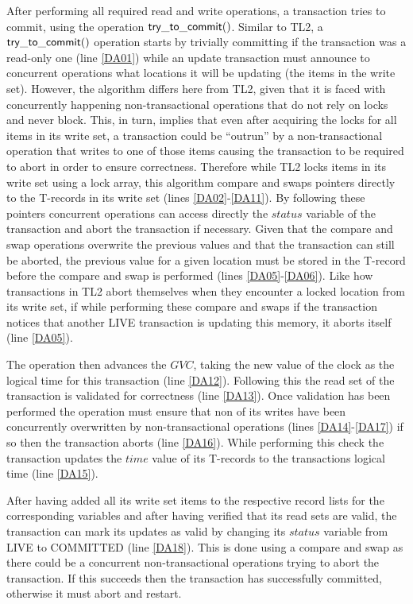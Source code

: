 \documentclass[11pt,letterpaper]{article}
\begin{document}
After  performing all  required read  and write  operations,  a transaction
tries to commit, using the operation  ${\sf try\_to\_commit()}$.
Similar to TL2, a ${\sf try\_to\_commit()}$ operation 
starts by trivially committing if the transaction was a read-only one 
(line \ref{DA01}) while
an update transaction must announce to concurrent operations what locations it will be updating
(the items in the write set).
However, the algorithm  differs 
here from TL2, given that 
it is faced with concurrently happening non-transactional operations
that do not rely on locks and never block. 
This, in turn, implies 
that even after acquiring the locks for all items in its write set, 
a transaction could be {}``outrun'' by 
a non-transactional operation that writes to one of those items
causing the transaction to be required to abort in order to ensure correctness. 
Therefore while TL2 locks items in its write set using a
lock array, this algorithm compare and swaps pointers directly to the T-records
in its write set (lines \ref{DA02}-\ref{DA11}).
By following these pointers concurrent operations can access directly the
$\mathit{status}$ variable of the transaction and abort the transaction
if necessary.
Given that the compare and swap operations overwrite the previous values
and that the transaction can still be aborted,
the previous value for a given location must be stored in the T-record
before the compare and swap is performed (lines \ref{DA05}-\ref{DA06}).
Like how transactions in TL2 abort themselves when they encounter a locked
location from its write set,
if while performing these compare and swaps if the transaction notices
that another LIVE transaction is updating this memory, it aborts itself
(line \ref{DA05}).

The operation then advances the $\mathit{GVC}$, taking the
new value of the clock as the logical time for this transaction (line \ref{DA12}).
Following this the read set of the transaction is validated for
correctness (line \ref{DA13}).
Once validation has been performed the operation must
ensure that non of its writes have been concurrently
overwritten by non-transactional operations (lines \ref{DA14}-\ref{DA17})
if so then the transaction aborts (line \ref{DA16}).
While performing this check the transaction updates the $\mathit{time}$
value of its T-records to the transactions logical time (line \ref{DA15}).

After having added all its write set items to the respective 
record lists for the corresponding variables 
and after having verified that its read sets are valid, the 
transaction can mark its updates as valid by 
changing its 
$\mathit{status}$ variable from LIVE to COMMITTED (line \ref{DA18}).
This is done using a compare and swap as there could be
a concurrent non-transactional operations trying to abort the transaction.  
If this succeeds then the transaction has successfully committed, otherwise
it must abort and restart.
\end{document}
